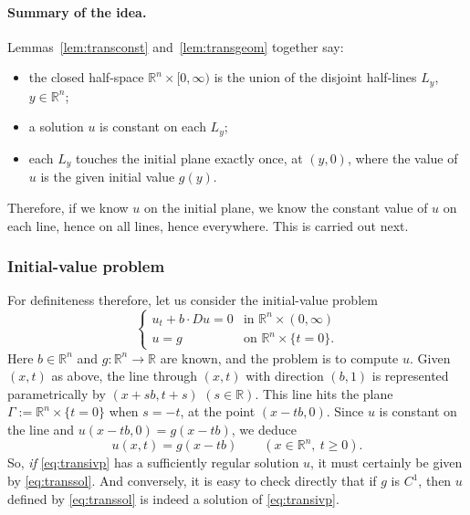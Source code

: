 \documentclass[11pt]{article}
\theoremstyle{plain}
\theoremstyle{definition}
\theoremstyle{remark}
\begin{document}
\paragraph{Summary of the idea.} Lemmas~\ref{lem:transconst} and~\ref{lem:transgeom} together say:
\begin{itemize}
    \item the closed half-space $\mathbb{R}^n \times [0,\infty)$ is the union of the disjoint half-lines $L_y$, $y \in \mathbb{R}^n$;
    \item a solution $u$ is constant on each $L_y$;
    \item each $L_y$ touches the initial plane exactly once, at $(y,0)$, where the value of $u$ is the given initial value $g(y)$.
\end{itemize}
Therefore, if we know $u$ on the initial plane, we know the constant value of $u$ on each line, hence on all lines, hence everywhere. This is carried out next.

\subsubsection{Initial-value problem}

For definiteness therefore, let us consider the initial-value problem
\begin{equation}\label{eq:transivp}
\begin{cases} u_t + b\cdot Du = 0 & \text{in } \mathbb{R}^n \times (0,\infty) \\ u = g & \text{on } \mathbb{R}^n \times \{t = 0\}. \end{cases}
\end{equation}
Here $b \in \mathbb{R}^n$ and $g : \mathbb{R}^n \to \mathbb{R}$ are known, and the problem is to compute $u$. Given $(x,t)$ as above, the line through $(x,t)$ with direction $(b,1)$ is represented parametrically by $(x + sb, t + s)$ $(s \in \mathbb{R})$. This line hits the plane $\Gamma := \mathbb{R}^n \times \{t = 0\}$ when $s = -t$, at the point $(x - tb, 0)$. Since $u$ is constant on the line and $u(x - tb,0) = g(x - tb)$, we deduce
\begin{equation}\label{eq:transsol}
u(x,t) = g(x - tb) \qquad (x \in \mathbb{R}^n,\ t \geq 0).
\end{equation}
So, \emph{if} \eqref{eq:transivp} has a sufficiently regular solution $u$, it must certainly be given by \eqref{eq:transsol}. And conversely, it is easy to check directly that if $g$ is $C^1$, then $u$ defined by \eqref{eq:transsol} is indeed a solution of \eqref{eq:transivp}.
\end{document}
